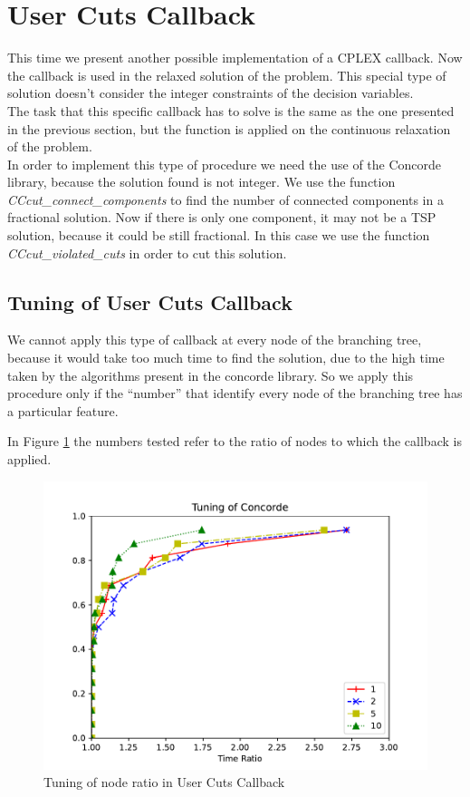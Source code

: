 \section{User Cuts Callback}
This time we present another possible implementation of a CPLEX callback. Now the callback is used in the relaxed solution of the problem. This special type of solution doesn’t consider the integer constraints of the decision variables. \\
The task that this specific callback has to solve is the same as the one presented in the previous section, but the function  is applied on the continuous relaxation of the problem.\\
In order to implement this type of procedure we need the use of the Concorde library, because the solution found is not integer.
We use the function \textit{CCcut\_connect\_components} to find the number of connected components in a fractional solution. Now if there is only one component, it may not be a TSP solution, because it could be still fractional. In this case we use the function \textit{CCcut\_violated\_cuts} in order to cut this solution.\\


\subsection{Tuning of User Cuts Callback}
We cannot apply this type of callback at every node of the branching tree, because it would take too much time to find the solution, due to the high time taken by the algorithms present in the concorde library. So we apply this procedure only if the “number” that identify every node of the branching tree has a particular feature.

In Figure \ref{fig:concorde} the numbers tested refer to the ratio of nodes to which the callback is applied.

\begin{figure}[!h]
    \centering
    \includegraphics[width=\textwidth]{images/concorde.pdf}
    \caption{Tuning of node ratio in User Cuts Callback}
    \label{fig:concorde}
\end{figure}

